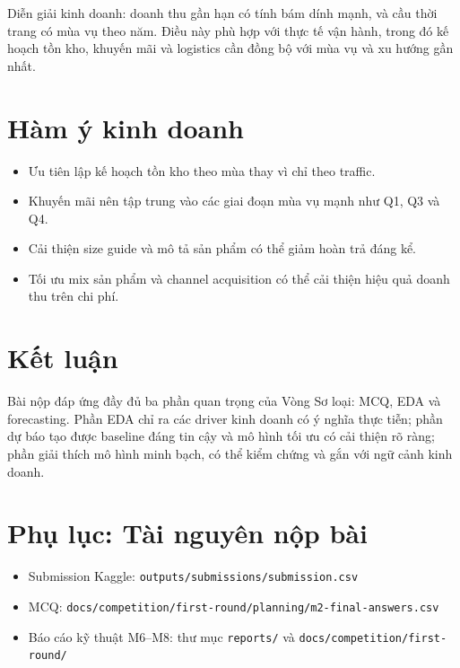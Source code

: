 \documentclass[10pt]{article}
\begin{document}
Diễn giải kinh doanh: doanh thu gần hạn có tính bám dính mạnh, và cầu thời trang có mùa vụ theo năm. Điều này phù hợp với thực tế vận hành, trong đó kế hoạch tồn kho, khuyến mãi và logistics cần đồng bộ với mùa vụ và xu hướng gần nhất.

\section{Hàm ý kinh doanh}
\begin{itemize}
\item Ưu tiên lập kế hoạch tồn kho theo mùa thay vì chỉ theo traffic.
\item Khuyến mãi nên tập trung vào các giai đoạn mùa vụ mạnh như Q1, Q3 và Q4.
\item Cải thiện size guide và mô tả sản phẩm có thể giảm hoàn trả đáng kể.
\item Tối ưu mix sản phẩm và channel acquisition có thể cải thiện hiệu quả doanh thu trên chi phí.
\end{itemize}

\section{Kết luận}
Bài nộp đáp ứng đầy đủ ba phần quan trọng của Vòng Sơ loại: MCQ, EDA và forecasting. Phần EDA chỉ ra các driver kinh doanh có ý nghĩa thực tiễn; phần dự báo tạo được baseline đáng tin cậy và mô hình tối ưu có cải thiện rõ ràng; phần giải thích mô hình minh bạch, có thể kiểm chứng và gắn với ngữ cảnh kinh doanh.

\section*{Phụ lục: Tài nguyên nộp bài}
\begin{itemize}
\item Submission Kaggle: \texttt{outputs/submissions/submission.csv}
\item MCQ: \texttt{docs/competition/first-round/planning/m2-final-answers.csv}
\item Báo cáo kỹ thuật M6--M8: thư mục \texttt{reports/} và \texttt{docs/competition/first-round/}
\end{itemize}
\end{document}
